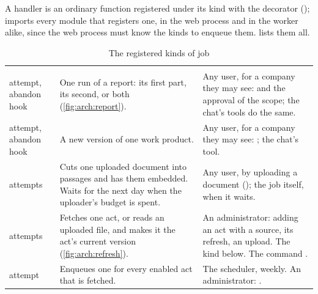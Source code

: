 A handler is an ordinary function registered under its kind with the decorator
 ();  imports every module that
registers one, in the web process and in the worker alike, since the web process must know
the kinds to enqueue them.  lists them all.

\begin{xltabular}{\textwidth}{@{}L{37mm}YL{43mm}@{}}
\caption{The registered kinds of job}\label{tab:arch:kinds}\\
\toprule
{} &  &  \\
\midrule
\endfirsthead
\toprule
{} &  &  \\
\midrule
\endhead
\bottomrule
\endlastfoot
{}\newline {} attempt, abandon hook & One run of a report: its first part, its second, or both (\cref{fig:arch:report}). & Any user, for a company they may see:  and the approval of the scope; the chat's tools do the same. \\
\newline {} attempt, abandon hook & A new version of one work product. & Any user, for a company they may see: ; the chat's tool. \\
\newline {} attempts & Cuts one uploaded document into passages and has them embedded. Waits for the next day when the uploader's budget is spent. & Any user, by uploading a document (); the job itself, when it waits. \\
\newline {} attempts & Fetches one act, or reads an uploaded file, and makes it the act's current version (\cref{fig:arch:refresh}). & An administrator: adding an act with a source, its refresh, an upload. The kind below. The command . \\
\newline {} attempt & Enqueues one  for every enabled act that is fetched. & The scheduler, weekly. An administrator: . \\

\end{xltabular}
